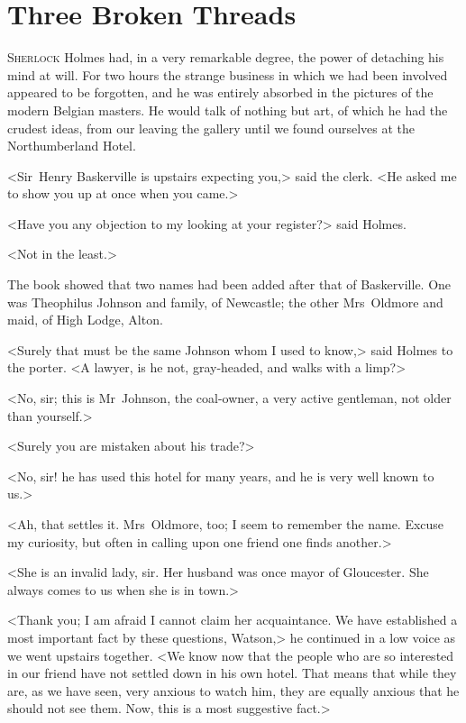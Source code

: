 
\chapter{Three Broken Threads}
\lettrine{S}{herlock} Holmes had, in a very remarkable degree, the power of detaching his mind at will. For two hours the strange business in which we had been involved appeared to be forgotten, and he was entirely absorbed in the pictures of the modern Belgian masters. He would talk of nothing but art, of which he had the crudest ideas, from our leaving the gallery until we found ourselves at the Northumberland Hotel.

<Sir~Henry Baskerville is upstairs expecting you,> said the clerk. <He asked me to show you up at once when you came.>

<Have you any objection to my looking at your register?> said Holmes.

<Not in the least.>

The book showed that two names had been added after that of Baskerville. One was Theophilus Johnson and family, of Newcastle; the other Mrs~Oldmore and maid, of High Lodge, Alton.

<Surely that must be the same Johnson whom I used to know,> said Holmes to the porter. <A lawyer, is he not, gray-headed, and walks with a limp?>

<No, sir; this is Mr~Johnson, the coal-owner, a very active gentleman, not older than yourself.>

<Surely you are mistaken about his trade?>

<No, sir! he has used this hotel for many years, and he is very well known to us.>

<Ah, that settles it. Mrs~Oldmore, too; I seem to remember the name. Excuse my curiosity, but often in calling upon one friend one finds another.>

<She is an invalid lady, sir. Her husband was once mayor of Gloucester. She always comes to us when she is in town.>

<Thank you; I am afraid I cannot claim her acquaintance. We have established a most important fact by these questions, Watson,> he continued in a low voice as we went upstairs together. <We know now that the people who are so interested in our friend have not settled down in his own hotel. That means that while they are, as we have seen, very anxious to watch him, they are equally anxious that he should not see them. Now, this is a most suggestive fact.>

